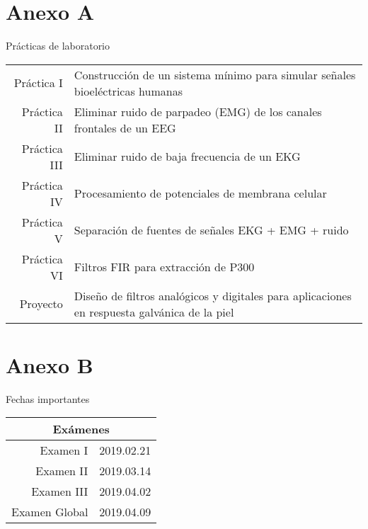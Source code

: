 \documentclass[letterpaper, 11pt]{article}
\begin{document}
\section*{Anexo A}
Prácticas de laboratorio
\begin{center}
 \begin{tabular}{rp{}}
  Práctica I& Construcción de un sistema mínimo para simular señales bioeléctricas humanas\\
Práctica II& Eliminar ruido de parpadeo (EMG) de los canales frontales de un EEG\\
Práctica III& Eliminar ruido de baja frecuencia de un EKG\\
Práctica IV& Procesamiento de potenciales de membrana celular\\
Práctica V& Separación de fuentes de señales EKG + EMG + ruido\\
Práctica VI& Filtros FIR para extracción de P300\\
Proyecto &Diseño de filtros analógicos y digitales para aplicaciones en respuesta galvánica de la piel
 \end{tabular}
\end{center}

\section*{Anexo B}
Fechas importantes
\begin{center}
  \begin{tabular}{rl}
  	\multicolumn{2}{c}{\bf Exámenes}\\\hline
    Examen I  & 2019.02.21\\
    Examen II & 2019.03.14\\
    Examen III& 2019.04.02\\
    Examen Global& 2019.04.09\\
    \hline
  \end{tabular}
\end{center}

\vfill
\firma
\end{document}
